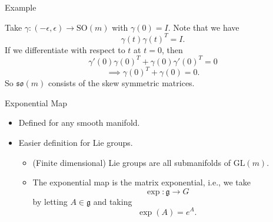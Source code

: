 \documentclass[usenames,dvipsnames]{beamer}
\theoremstyle{definition}
\theoremstyle{theorem}
\begin{document}
    \begin{frame}{Example}
        \begin{example}
        Take $\gamma\colon (-\epsilon,\epsilon) \to \mathrm{SO}(m)$ with $\gamma(0)=I$.  Note that we have
        \[
        \gamma(t)\gamma(t)^T=I.
        \]
        If we differentiate with respect to $t$ at $t=0$, then
        \[
        \gamma'(0)\gamma(0)^T+\gamma(0)\gamma'(0)^T=0
        \]
        \[
        \implies \gamma(0)^T+\gamma(0)=0.
        \]
        So $\mathfrak{so}(m)$ consists of the skew symmetric matrices.
        \end{example}
    \end{frame}
    
    
    \begin{frame}{Exponential Map}
    \begin{itemize}
        \item Defined for any smooth manifold.
        \item Easier definition for Lie groups.
        \begin{itemize}
            \item (Finite dimensional) Lie groups are all submanifolds of $\mathrm{GL}(m)$.
            \item The exponential map is the matrix exponential, i.e., we take
            \[
            \exp \colon \mathfrak{g} \to G
            \]
            by letting $A\in \mathfrak{g}$ and taking
            \[
            \exp(A)=e^{A}.
            \]
        \end{itemize}
    \end{itemize}
    \end{frame}
    
\end{document}

